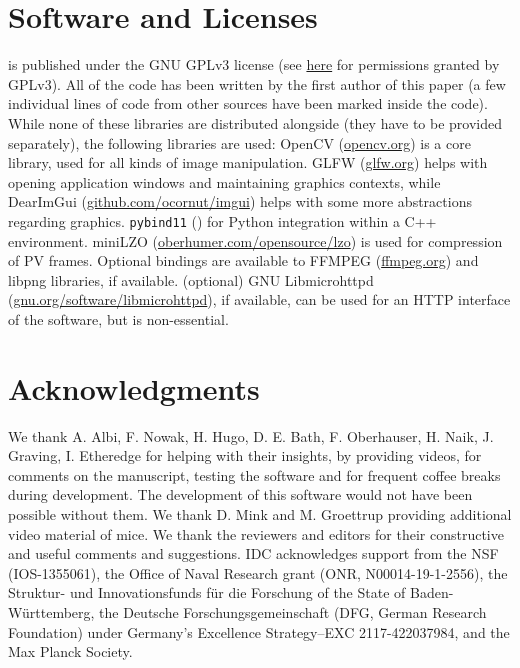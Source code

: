 \documentclass[9pt,lineno]{elife}
\newcommand{\TRex}{\protect\path{TRex}}
\begin{document}
\section{Software and Licenses}

\TRex{} is published under the GNU GPLv3 license (see \href{https://choosealicense.com/licenses/gpl-3.0/}{here} for permissions granted by GPLv3). All of the code has been written by the first author of this paper (a few individual lines of code from other sources have been marked inside the code). While none of these libraries are distributed alongside \TRex{} (they have to be provided separately), the following libraries are used: OpenCV (\href{https://opencv.org/about/}{opencv.org}) is a core library, used for all kinds of image manipulation. GLFW (\href{https://www.glfw.org}{glfw.org}) helps with opening application windows and maintaining graphics contexts, while DearImGui (\href{https://github.com/ocornut/imgui}{github.com/ocornut/imgui}) helps with some more abstractions regarding graphics. \texttt{pybind11} (\cite{pybind11}) for Python integration within a C++ environment. miniLZO (\href{http://www.oberhumer.com/opensource/lzo/\#minilzo}{oberhumer.com/opensource/lzo}) is used for compression of PV frames. Optional bindings are available to FFMPEG (\href{http://ffmpeg.org}{ffmpeg.org}) and libpng libraries, if available. (optional) GNU Libmicrohttpd (\href{https://www.gnu.org/software/libmicrohttpd/}{gnu.org/software/libmicrohttpd}), if available, can be used for an HTTP interface of the software, but is non-essential.

\section{Acknowledgments}

We thank A. Albi, F. Nowak, H. Hugo, D. E. Bath, F. Oberhauser, H. Naik, J. Graving, I. Etheredge for helping with their insights, by providing videos, for comments on the manuscript, testing the software and for frequent coffee breaks during development. The development of this software would not have been possible without them. {\color{blue}We thank D. Mink and M. Groettrup providing additional video material of mice. We thank the reviewers and editors for their constructive and useful comments and suggestions.} IDC acknowledges support from the NSF (IOS-1355061), the Office of Naval Research grant (ONR, N00014-19-1-2556), the Struktur- und Innovationsfunds f\"{u}r die Forschung of the State of Baden-W\"{u}rttemberg, the Deutsche Forschungsgemeinschaft (DFG, German Research Foundation) under Germany's Excellence Strategy--EXC 2117-422037984, and the Max Planck Society.
\end{document}
